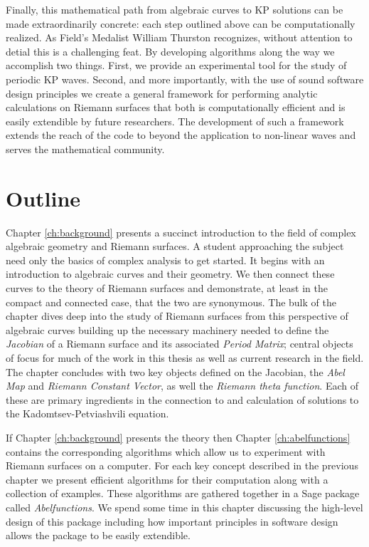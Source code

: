 Finally, this mathematical path from algebraic curves to KP solutions can be
made extraordinarily concrete: each step outlined above can be computationally
realized. As Field's Medalist William Thurston recognizes, without attention to
detial this is a challenging feat. By developing algorithms along the way we
accomplish two things. First, we provide an experimental tool for the study of
periodic KP waves. Second, and more importantly, with the use of sound software
design principles we create a general framework for performing analytic
calculations on Riemann surfaces that both is computationally efficient and is
easily extendible by future researchers. The development of such a framework
extends the reach of the code to beyond the application to non-linear waves and
serves the mathematical community.

\section{Outline} \label{sec:outline}

Chapter \ref{ch:background} presents a succinct introduction to the field of
complex algebraic geometry and Riemann surfaces. A student approaching the
subject need only the basics of complex analysis to get started. It begins with
an introduction to algebraic curves and their geometry. We then connect these
curves to the theory of Riemann surfaces and demonstrate, at least in the
compact and connected case, that the two are synonymous. The bulk of the chapter
dives deep into the study of Riemann surfaces from this perspective of algebraic
curves building up the necessary machinery needed to define the {\it Jacobian}
of a Riemann surface and its associated {\it Period Matrix}; central objects of
focus for much of the work in this thesis as well as current research in the
field. The chapter concludes with two key objects defined on the Jacobian, the
{\it Abel Map} and {\it Riemann Constant Vector}, as well the {\it Riemann theta
  function}. Each of these are primary ingredients in the connection to and
calculation of solutions to the Kadomtsev-Petviashvili equation.

If Chapter \ref{ch:background} presents the theory then Chapter
\ref{ch:abelfunctions} contains the corresponding algorithms which allow us to
experiment with Riemann surfaces on a computer. For each key concept described
in the previous chapter we present efficient algorithms for their computation
along with a collection of examples. These algorithms are gathered together in a
Sage package called {\it Abelfunctions}. We spend some time in this chapter
discussing the high-level design of this package including how important
principles in software design allows the package to be easily extendible.

